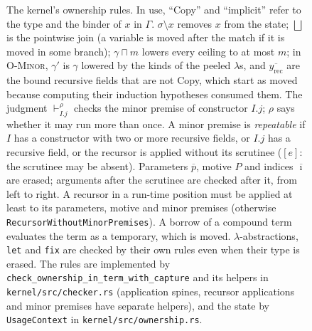 \begin{figure}[p]
\begin{mathpar}

\end{mathpar}
\caption{The kernel's ownership rules. In $\mathrm{use}$, ``Copy'' and ``implicit'' refer to the type and the binder of $x$ in $\Gamma$. $\sigma \setminus x$ removes $x$ from the state; $\bigsqcup$ is the pointwise join (a variable is moved after the match if it is moved in some branch); $\gamma \sqcap m$ lowers every ceiling to at most $m$; in \textsc{O-Minor}, $\gamma'$ is $\gamma$ lowered by the kinds of the peeled $\lambda$s, and $\overline{y_{\mathrm{rec}}}$ are the bound recursive fields that are not Copy, which start as moved because computing their induction hypotheses consumed them. The judgment $\vdash^{\rho}_{I.j}$ checks the minor premise of constructor $I.j$; $\rho$ says whether it may run more than once. A minor premise is \emph{repeatable} if $I$ has a constructor with two or more recursive fields, or $I.j$ has a recursive field, or the recursor is applied without its scrutinee ($[e]$: the scrutinee may be absent). Parameters $\overline{p}$, motive $P$ and indices $\overline{\imath}$ are erased; arguments after the scrutinee are checked after it, from left to right. A recursor in a run-time position must be applied at least to its parameters, motive and minor premises (otherwise \lstinline|RecursorWithoutMinorPremises|). A borrow of a compound term evaluates the term as a temporary, which is moved. $\lambda$-abstractions, \lstinline|let| and \lstinline|fix| are checked by their own rules even when their type is erased. The rules are implemented by \texttt{check\_ownership\_in\_term\_with\_capture} and its helpers in \texttt{kernel/src/checker.rs} (application spines, recursor applications and minor premises have separate helpers), and the state by \texttt{UsageContext} in \texttt{kernel/src/ownership.rs}.}
\label{fig:own}
\end{figure}

